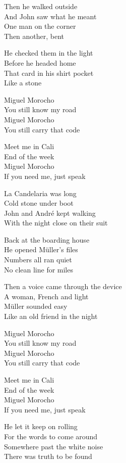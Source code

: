 \begin{lyrics}
Then he walked outside\\
And John saw what he meant\\
One man on the corner\\
Then another, bent

He checked them in the light\\
Before he headed home\\
That card in his shirt pocket\\
Like a stone

Miguel Morocho\\
You still know my road\\
Miguel Morocho\\
You still carry that code

Meet me in Cali\\
End of the week\\
Miguel Morocho\\
If you need me, just speak

La Candelaria was long\\
Cold stone under boot\\
John and André kept walking\\
With the night close on their suit

Back at the boarding house\\
He opened Müller’s files\\
Numbers all ran quiet\\
No clean line for miles

Then a voice came through the device\\
A woman, French and light\\
Müller sounded easy\\
Like an old friend in the night

Miguel Morocho\\
You still know my road\\
Miguel Morocho\\
You still carry that code

Meet me in Cali\\
End of the week\\
Miguel Morocho\\
If you need me, just speak

He let it keep on rolling\\
For the words to come around\\
Somewhere past the white noise\\
There was truth to be found
\end{lyrics}
